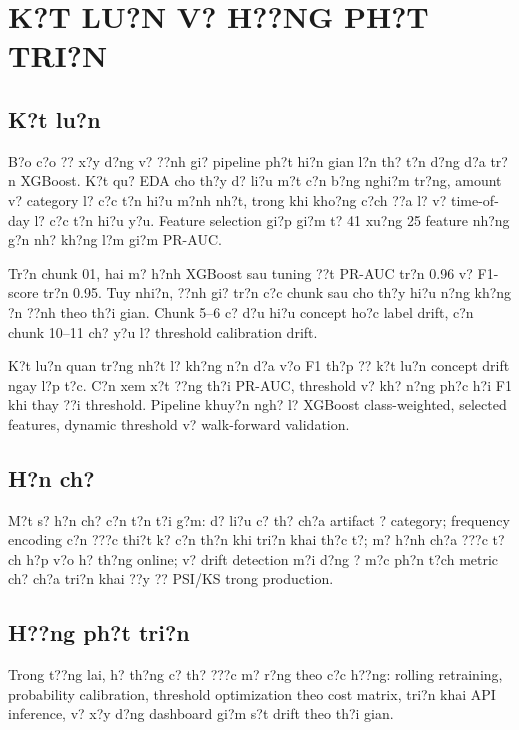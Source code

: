 \cleardoublepage
\section*{K?T LU?N V? H??NG PH?T TRI?N}

\subsection*{K?t lu?n}

B?o c?o ?? x?y d?ng v? ??nh gi? pipeline ph?t hi?n gian l?n th? t?n d?ng d?a tr?n XGBoost. K?t qu? EDA cho th?y d? li?u m?t c?n b?ng nghi?m tr?ng, amount v? category l? c?c t?n hi?u m?nh nh?t, trong khi kho?ng c?ch ??a l? v? time-of-day l? c?c t?n hi?u y?u. Feature selection gi?p gi?m t? 41 xu?ng 25 feature nh?ng g?n nh? kh?ng l?m gi?m PR-AUC.

Tr?n chunk 01, hai m? h?nh XGBoost sau tuning ??t PR-AUC tr?n 0.96 v? F1-score tr?n 0.95. Tuy nhi?n, ??nh gi? tr?n c?c chunk sau cho th?y hi?u n?ng kh?ng ?n ??nh theo th?i gian. Chunk 5--6 c? d?u hi?u concept ho?c label drift, c?n chunk 10--11 ch? y?u l? threshold calibration drift.

K?t lu?n quan tr?ng nh?t l? kh?ng n?n d?a v?o F1 th?p ?? k?t lu?n concept drift ngay l?p t?c. C?n xem x?t ??ng th?i PR-AUC, threshold v? kh? n?ng ph?c h?i F1 khi thay ??i threshold. Pipeline khuy?n ngh? l? XGBoost class-weighted, selected features, dynamic threshold v? walk-forward validation.

\subsection*{H?n ch?}

M?t s? h?n ch? c?n t?n t?i g?m: d? li?u c? th? ch?a artifact ? category; frequency encoding c?n ???c thi?t k? c?n th?n khi tri?n khai th?c t?; m? h?nh ch?a ???c t?ch h?p v?o h? th?ng online; v? drift detection m?i d?ng ? m?c ph?n t?ch metric ch? ch?a tri?n khai ??y ?? PSI/KS trong production.

\subsection*{H??ng ph?t tri?n}

Trong t??ng lai, h? th?ng c? th? ???c m? r?ng theo c?c h??ng: rolling retraining, probability calibration, threshold optimization theo cost matrix, tri?n khai API inference, v? x?y d?ng dashboard gi?m s?t drift theo th?i gian.
